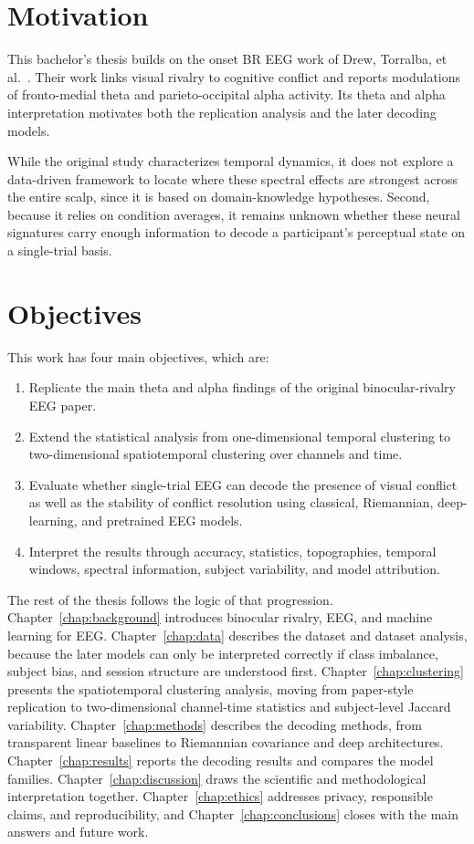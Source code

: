 \documentclass[11pt,a4paper,chapterprefix=false,parskip=false]{scrreprt}
\begin{document}
\section{Motivation}
This bachelor's thesis builds on the onset BR EEG work of Drew, Torralba, et al.~\citep{drew_binocular_2026, drew_conflict_2022}. Their work links visual rivalry to cognitive conflict and reports modulations of fronto-medial theta and parieto-occipital alpha activity. Its theta and alpha interpretation motivates both the replication analysis and the later decoding models.

While the original study characterizes temporal dynamics, it does not explore a data-driven framework to locate where these spectral effects are strongest across the entire scalp, since it is based on domain-knowledge hypotheses. Second, because it relies on condition averages, it remains unknown whether these neural signatures carry enough information to decode a participant's perceptual state on a single-trial basis.

\section{Objectives}
This work has four main objectives, which are:
\begin{enumerate}
    \item Replicate the main theta and alpha findings of the original binocular-rivalry EEG paper.
    \item Extend the statistical analysis from one-dimensional temporal clustering to two-dimensional spatiotemporal clustering over channels and time.
    \item Evaluate whether single-trial EEG can decode the presence of visual conflict as well as the stability of conflict resolution using classical, Riemannian, deep-learning, and pretrained EEG models.
    \item Interpret the results through accuracy, statistics, topographies, temporal windows, spectral information, subject variability, and model attribution.
\end{enumerate}

The rest of the thesis follows the logic of that progression. Chapter~\ref{chap:background} introduces binocular rivalry, EEG, and machine learning for EEG. Chapter~\ref{chap:data} describes the dataset and dataset analysis, because the later models can only be interpreted correctly if class imbalance, subject bias, and session structure are understood first. Chapter~\ref{chap:clustering} presents the spatiotemporal clustering analysis, moving from paper-style replication to two-dimensional channel-time statistics and subject-level Jaccard variability. Chapter~\ref{chap:methods} describes the decoding methods, from transparent linear baselines to Riemannian covariance and deep architectures. Chapter~\ref{chap:results} reports the decoding results and compares the model families. Chapter~\ref{chap:discussion} draws the scientific and methodological interpretation together. Chapter~\ref{chap:ethics} addresses privacy, responsible claims, and reproducibility, and Chapter~\ref{chap:conclusions} closes with the main answers and future work.
\end{document}
